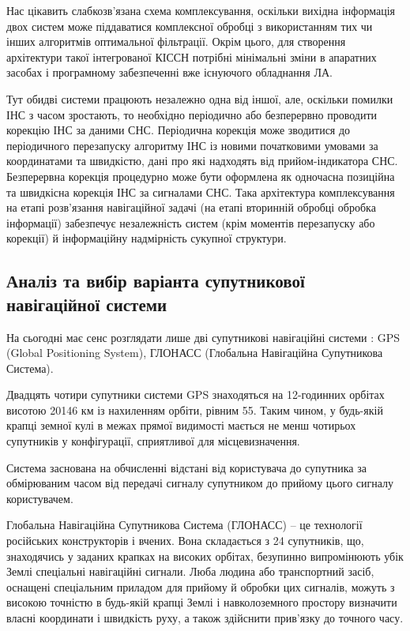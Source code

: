 Нас цікавить слабкозв’язана схема комплексування, оскільки вихідна інформація двох 
систем може піддаватися комплексної обробці з використанням тих чи інших алгоритмів 
оптимальної фільтрації.  Окрім цього, для створення  архітектури такої інтегрованої 
КІССН потрібні мінімальні зміни в апаратних засобах і програмному забезпеченні вже 
існуючого обладнання ЛА.

Тут обидві системи працюють незалежно одна від іншої, 
але, оскільки помилки ІНС з часом зростають, то необхідно періодично  або 
безперервно проводити корекцію ІНС за даними СНС. Періодична корекція може 
зводитися до періодичного перезапуску алгоритму ІНС із новими початковими 
умовами за координатами та швидкістю, дані про які надходять від прийом-індикатора 
СНС. Безперервна корекція процедурно може бути оформлена як одночасна позиційна та 
швидкісна корекція ІНС за сигналами СНС. Така архітектура комплексування на  етапі 
розв’язання навігаційної задачі (на етапі вторинній обробці обробка інформації) 
забезпечує незалежність систем (крім моментів  перезапуску або корекції) й 
інформаційну надмірність сукупної структури.

\subsection{Аналіз та вибір варіанта супутникової навігаційної системи}

На сьогодні має сенс розглядати лише дві супутникові навігаційні системи : GPS (Global Positioning System), 
ГЛОНАСС (Глобальна Навігаційна Супутникова Система).

Двадцять чотири супутники системи GPS знаходяться на 12-годинних орбітах висотою 
20146 км із нахиленням орбіти, рівним 55. Таким чином, 
у будь-якій крапці земної кулі в межах прямої видимості мається не менш чотирьох супутників 
у конфігурації, сприятливої для місцевизначення.

Система заснована на обчисленні відстані від користувача до супутника за обмірюваним часом 
від передачі сигналу супутником до прийому цього сигналу користувачем.

Глобальна Навігаційна Супутникова Система (ГЛОНАСС) -- це технології російських конструкторів і вчених.
Вона складається 
з 24 супутників, що, знаходячись у заданих крапках на високих орбітах, безупинно випромінюють 
убік Землі спеціальні навігаційні сигнали. Люба людина або транспортний засіб, оснащені 
спеціальним приладом для прийому й обробки цих сигналів, можуть з високою точністю в 
будь-якій крапці Землі і навколоземного простору визначити власні координати і швидкість 
руху, а також здійснити прив'язку до точного часу.


